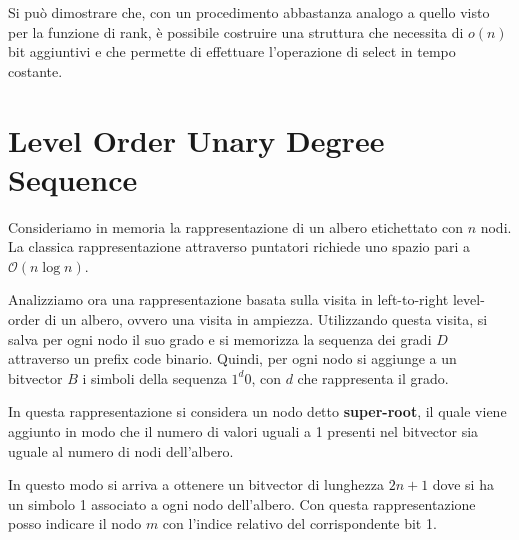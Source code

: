 \begin{osservazione}
    Si può dimostrare che, con un procedimento abbastanza analogo a quello visto
    per la funzione di rank, è possibile costruire una struttura che necessita di
    $o(n)$ bit aggiuntivi e che permette di effettuare l'operazione di select in
    tempo costante.
\end{osservazione}
\section{Level Order Unary Degree Sequence}
Consideriamo in memoria la rappresentazione di un albero etichettato con $n$ nodi.
La classica rappresentazione attraverso puntatori richiede uno spazio pari a
$\mathcal{O}(n \log n)$.

Analizziamo ora una rappresentazione basata sulla visita in left-to-right
level-order di un albero, ovvero una visita in ampiezza. Utilizzando questa
visita, si salva per ogni nodo il suo grado e si memorizza la sequenza dei gradi
$D$ attraverso un prefix code binario. Quindi, per ogni nodo si aggiunge a un
bitvector $B$ i simboli della sequenza $1^d0$, con $d$ che rappresenta il grado.

In questa rappresentazione si considera un nodo detto \textbf{super-root}, il
quale viene aggiunto in modo che il numero di valori uguali a 1 presenti nel
bitvector sia uguale al numero di nodi dell'albero.

In questo modo si arriva a ottenere un bitvector di lunghezza $2n + 1$ dove si
ha un simbolo 1 associato a ogni nodo dell'albero. Con questa rappresentazione
posso indicare il nodo $m$ con l'indice relativo del corrispondente bit 1.


